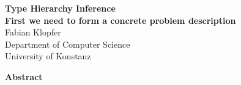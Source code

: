 \begin{titlepage}
\thispagestyle{plain}
   \begin{center}
       \vspace*{1cm}
        \Huge
       \textbf{Type Hierarchy Inference} \\
       \Large
       \textbf{First we need to form a concrete problem description}\\
       \vspace*{1cm}
       \normalsize
       Fabian Klopfer \\
       Department of Computer Science \\
       University of Konstanz \\
        \vspace*{1cm}
        
        \textbf{Abstract}
        
   \end{center}
\end{titlepage}

\newpage
\tableofcontents
